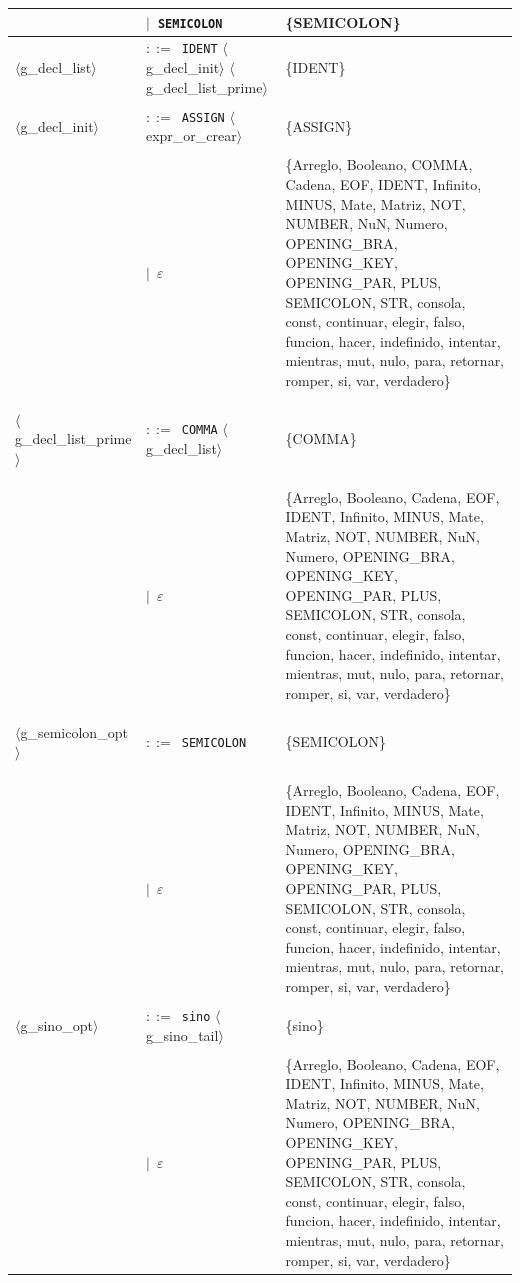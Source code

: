 \documentclass[10pt]{article}
\begin{document}
{\begin{longtable}{@{} p{2.0cm} p{6.9cm} p{6.9cm} @{}}
   & $\mid$~\texttt{SEMICOLON} & \{SEMICOLON\} \\
  \midrule
  \textcolor{ntcolor}{\parbox[t]{1.8cm}{\raggedright$\langle$g\_\allowbreak{}decl\_\allowbreak{}list$\rangle$}} & $::=$~\texttt{IDENT} $\langle$g\_decl\_init$\rangle$ $\langle$g\_decl\_list\_prime$\rangle$ & \{IDENT\} \\
  \midrule
  \textcolor{ntcolor}{\parbox[t]{1.8cm}{\raggedright$\langle$g\_\allowbreak{}decl\_\allowbreak{}init$\rangle$}} & $::=$~\texttt{ASSIGN} $\langle$expr\_or\_crear$\rangle$ & \{ASSIGN\} \\
   & $\mid$~$\varepsilon$ & \{Arreglo, Booleano, COMMA, Cadena, EOF, IDENT, Infinito, MINUS, Mate, Matriz, NOT, NUMBER, NuN, Numero, OPENING\_BRA, OPENING\_KEY, OPENING\_PAR, PLUS, SEMICOLON, STR, consola, const, continuar, elegir, falso, funcion, hacer, indefinido, intentar, mientras, mut, nulo, para, retornar, romper, si, var, verdadero\} \\
  \midrule
  \textcolor{ntcolor}{\parbox[t]{1.8cm}{\raggedright$\langle$g\_\allowbreak{}decl\_\allowbreak{}list\_\allowbreak{}prime$\rangle$}} & $::=$~\texttt{COMMA} $\langle$g\_decl\_list$\rangle$ & \{COMMA\} \\
   & $\mid$~$\varepsilon$ & \{Arreglo, Booleano, Cadena, EOF, IDENT, Infinito, MINUS, Mate, Matriz, NOT, NUMBER, NuN, Numero, OPENING\_BRA, OPENING\_KEY, OPENING\_PAR, PLUS, SEMICOLON, STR, consola, const, continuar, elegir, falso, funcion, hacer, indefinido, intentar, mientras, mut, nulo, para, retornar, romper, si, var, verdadero\} \\
  \midrule
  \textcolor{ntcolor}{\parbox[t]{1.8cm}{\raggedright$\langle$g\_\allowbreak{}semicolon\_\allowbreak{}opt$\rangle$}} & $::=$~\texttt{SEMICOLON} & \{SEMICOLON\} \\
   & $\mid$~$\varepsilon$ & \{Arreglo, Booleano, Cadena, EOF, IDENT, Infinito, MINUS, Mate, Matriz, NOT, NUMBER, NuN, Numero, OPENING\_BRA, OPENING\_KEY, OPENING\_PAR, PLUS, SEMICOLON, STR, consola, const, continuar, elegir, falso, funcion, hacer, indefinido, intentar, mientras, mut, nulo, para, retornar, romper, si, var, verdadero\} \\
  \midrule
  \textcolor{ntcolor}{\parbox[t]{1.8cm}{\raggedright$\langle$g\_\allowbreak{}sino\_\allowbreak{}opt$\rangle$}} & $::=$~\texttt{sino} $\langle$g\_sino\_tail$\rangle$ & \{sino\} \\
   & $\mid$~$\varepsilon$ & \{Arreglo, Booleano, Cadena, EOF, IDENT, Infinito, MINUS, Mate, Matriz, NOT, NUMBER, NuN, Numero, OPENING\_BRA, OPENING\_KEY, OPENING\_PAR, PLUS, SEMICOLON, STR, consola, const, continuar, elegir, falso, funcion, hacer, indefinido, intentar, mientras, mut, nulo, para, retornar, romper, si, var, verdadero\} \\

\end{longtable}}
\end{document}
